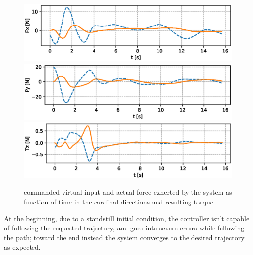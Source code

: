 \begin{figure}[bt]
    \centering
    \includegraphics[width=\linewidth]{Images/force-1.eps}
    \includegraphics[width=\linewidth]{Images/force-2.eps}
    \includegraphics[width=\linewidth]{Images/force-3.eps}
    \caption{commanded virtual input and actual force exherted by the system as function of time in the cardinal directions and resulting torque.}
    \label{fig:force}
\end{figure}

At the beginning, due to a standstill initial condition, the controller isn't capable of following the requested trajectory, and goes into severe errors while following the path; toward the end instead the system converges to the desired trajectory as expected.
